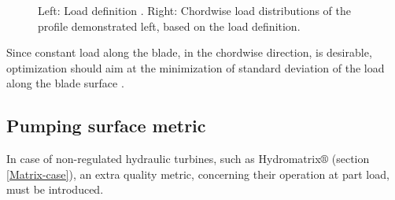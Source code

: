 \begin{figure}[h!]
\begin{minipage}[b]{0.5\linewidth}
 \centering
\end{minipage}
\begin{minipage}[b]{0.5\linewidth}
 \centering
\end{minipage}
\caption{Left: Load definition . Right: Chordwise load distributions of the profile demonstrated left, based on the load definition.}
\label{design-obj}
\end{figure}

Since constant load along the blade, in the chordwise direction, is desirable, optimization should aim at the minimization of standard deviation of the load along the blade surface . 


\subsection{Pumping surface metric}
In case of non-regulated hydraulic turbines, such as Hydromatrix$\circledR$ (section \ref{Matrix-case}), an extra quality metric, concerning their operation at part load, must be introduced.      

